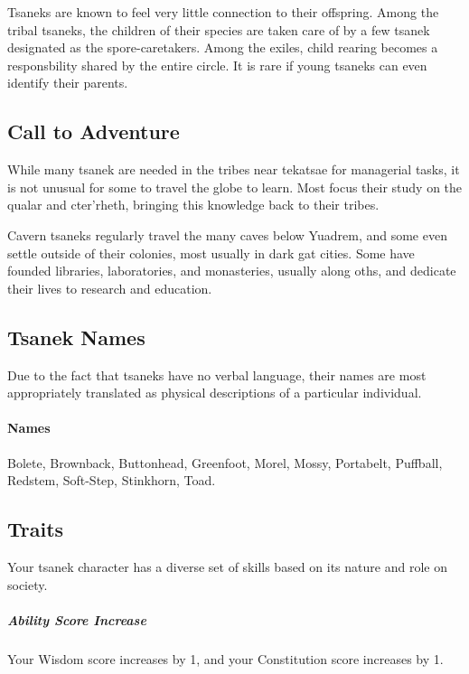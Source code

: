     Tsaneks are known to feel very little connection to their offspring.
    Among the tribal tsaneks, the children of their species are taken care of by a few tsanek designated as the spore-caretakers.
    Among the exiles, child rearing becomes a responsbility shared by the entire circle.
    It is rare if young tsaneks can even identify their parents.

\subsection*{Call to Adventure}
    While many tsanek are needed in the tribes near tekatsae for managerial tasks, it is not unusual for some to travel the globe to learn.
    Most focus their study on the qualar and cter'rheth, bringing this knowledge back to their tribes.

    Cavern tsaneks regularly travel the many caves below Yuadrem, and some even settle outside of their colonies, most usually in dark gat cities.
    Some have founded libraries, laboratories, and monasteries, usually along oths, and dedicate their lives to research and education.

\subsection*{Tsanek Names}
    Due to the fact that tsaneks have no verbal language, their names are most appropriately translated as physical descriptions of a particular individual.

    \paragraph{Names}
    Bolete, Brownback, Buttonhead, Greenfoot, Morel, Mossy, Portabelt, Puffball, Redstem, Soft-Step, Stinkhorn, Toad.


\subsection*{Traits}
    Your tsanek character has a diverse set of skills based on its nature and role on society.

    \subparagraph{Ability Score Increase} Your Wisdom score increases by 1, and your Constitution score increases by 1.

